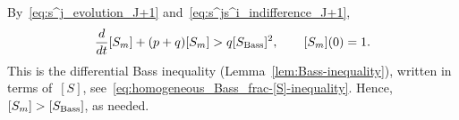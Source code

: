 \documentclass[review]{elsarticle}
\begin{document}
By~\eqref{eq:s^j_evolution_J+1} and~\eqref{eq:s^js^i_indifference_J+1},
\begin{equation*}
	\frac{d}{dt}[S_m]+(p+q)[S_m]>q[S_{\rm Bass}]^2, \qquad [S_m](0)=1 .
\end{equation*}
This is the differential Bass inequality (Lemma~\ref{lem:Bass-inequality}), written in terms
of~$[S]$, see~\eqref{eq:homogeneous_Bass_frac-[S]-inequality}.  Hence, 
$[S_m] > [S_{\rm Bass}]$, as needed.
%	
%	
\end{document}
